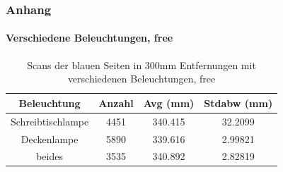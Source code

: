 \documentclass[xcolor=dvipsnames]{beamer}
\begin{document}
\begin{frame}[noframenumbering]
	\frametitle{Anhang}
	\framesubtitle{Verschiedene Beleuchtungen, free}
	\begin{table}
		\begin{tabular}{c|c|c|c}
			Beleuchtung & Anzahl & Avg (mm) & Stdabw (mm) \\ 
			\hline
			Schreibtischlampe & 4451 & 340.415 & 32.2099 \\
			Deckenlampe & 5890 & 339.616 & 2.99821 \\
			beides & 3535 & 340.892 & 2.82819 \\
		\end{tabular}
		\caption{Scans der blauen Seiten in 300mm Entfernungen mit verschiedenen Beleuchtungen, free}
	\end{table}
\end{frame}
\end{document}
